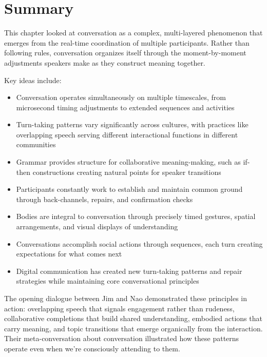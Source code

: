 \section{Summary}

This chapter looked at conversation as a complex, multi-layered phenomenon that emerges from the real-time coordination of multiple participants. Rather than following rules, conversation organizes itself through the moment-by-mo\-ment adjustments speakers make as they construct meaning together.

Key ideas include:

\begin{itemize}[noitemsep]
\item Conversation operates simultaneously on multiple timescales, from microsecond timing adjustments to extended sequences and activities
\item Turn-taking patterns vary significantly across cultures, with practices like overlapping speech serving different interactional functions in different communities
\item Grammar provides structure for collaborative meaning-making, such as if-then constructions creating natural points for speaker transitions
\item Participants constantly work to establish and maintain common ground through back-channels, repairs, and confirmation checks
\item Bodies are integral to conversation through precisely timed gestures, spatial arrangements, and visual displays of understanding
\item Conversations accomplish social actions through sequences, each turn creating expectations for what comes next
\item Digital communication has created new turn-taking patterns and repair strategies while maintaining core conversational principles
\end{itemize}

The opening dialogue between Jim and Nao demonstrated these principles in action: overlapping speech that signals engagement rather than rudeness, collaborative completions that build shared understanding, embodied actions that carry meaning, and topic transitions that emerge organically from the interaction. Their meta-conversation about conversation illustrated how these patterns operate even when we're consciously attending to them.


